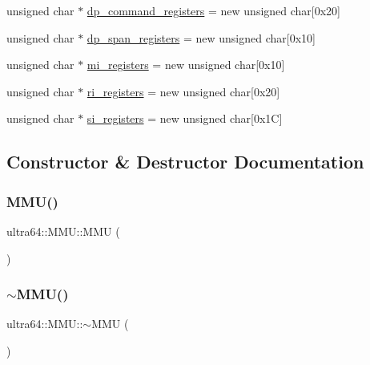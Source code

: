 \begin{DoxyCompactItemize}
\item 
unsigned char $\ast$ \hyperlink{classultra64_1_1_m_m_u_a9d4a71c847de246e9a23149921e7312e}{dp\+\_\+command\+\_\+registers} = new unsigned char\mbox{[}0x20\mbox{]}
\item 
unsigned char $\ast$ \hyperlink{classultra64_1_1_m_m_u_af6b87f01506b320306aefde9d1d7de8c}{dp\+\_\+span\+\_\+registers} = new unsigned char\mbox{[}0x10\mbox{]}
\item 
unsigned char $\ast$ \hyperlink{classultra64_1_1_m_m_u_a470447b5a22c8081ee5cd1da7f3c4724}{mi\+\_\+registers} = new unsigned char\mbox{[}0x10\mbox{]}
\item 
unsigned char $\ast$ \hyperlink{classultra64_1_1_m_m_u_a73128f9d67e5ebb8182c4f57d2b5af3f}{ri\+\_\+registers} = new unsigned char\mbox{[}0x20\mbox{]}
\item 
unsigned char $\ast$ \hyperlink{classultra64_1_1_m_m_u_a0256b081d410cd7375f4837326326dd9}{si\+\_\+registers} = new unsigned char\mbox{[}0x1\+C\mbox{]}
\end{DoxyCompactItemize}


\subsection{Constructor \& Destructor Documentation}
\mbox{\label{classultra64_1_1_m_m_u_a2fdb1cba73825c3988f2a1216e806c7c}} 
\subsubsection{\texorpdfstring{M\+M\+U()}{MMU()}}
{\footnotesize\ttfamily ultra64\+::\+M\+M\+U\+::\+M\+MU (\begin{DoxyParamCaption}{ }\end{DoxyParamCaption})}

\mbox{\label{classultra64_1_1_m_m_u_a9ee9394ce2502116d7773d5f6123a24e}} 
\subsubsection{\texorpdfstring{$\sim$\+M\+M\+U()}{~MMU()}}
{\footnotesize\ttfamily ultra64\+::\+M\+M\+U\+::$\sim$\+M\+MU (\begin{DoxyParamCaption}{ }\end{DoxyParamCaption})}



